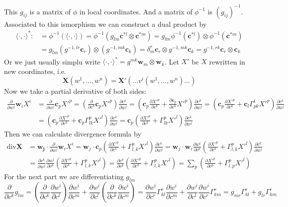 This $g_{ij}$ is a matrix of $\phi$ in local coordinates. And a matrix of $\phi^{-1}$ is
$(g_{ij})^{-1}$. Associated to this ismorphism we can construct a dual product by
\begin{align*}
    \langle\cdot,\cdot\rangle^*:&=\phi^{-1}(\langle\cdot,\cdot\rangle)=\phi^{-1}(g_{lm}\mathbf{c}^{*l}\otimes\mathbf{c}^{*m})
=g_{lm}\phi^{-1}(\mathbf{c}^{*l})\otimes\phi^{-1}(\mathbf{c}^{*m})\\
    &=g_{lm}(g^{-1,lr}\mathbf{c}_r)\otimes(g^{-1,mk}\mathbf{c}_k)
=\delta_m^r\mathbf{c}_r\otimes g^{-1,mk}\mathbf{c}_k=g^{-1,rk}\mathbf{c}_r\otimes \mathbf{c}_k
\end{align*}
Or we just usually simplu write $\langle\cdot,\cdot\rangle^*=g^{mk}\mathbf{w}_m\otimes \mathbf{w}_k$.
Let $X'$ be $X$ rewritten in new coordinates, i.e.
\[\mathbf{X}(w^1,...,w^n)=\mathbf{X}'(...v^i(w^1,...,w^n)...)\]
Now we take a partial derivative of both sides:
\begin{align*}
\frac{\partial}{\partial w^j}\mathbf{w}_iX^i&
=\frac{\partial}{\partial w^j}\mathbf{c}_pX'^p
=(\frac{\partial}{\partial c^k}\mathbf{c}_pX'^p)\frac{\partial c^k}{\partial w^j}
=(\mathbf{c}_p\frac{\partial X'^p}{\partial c^k}+\frac{\partial\mathbf{c}_p}{\partial c^k}X'^p)\frac{\partial c^k}{\partial w^j}
=(\mathbf{c}_p\frac{\partial X'^p}{\partial c^k}+\mathbf{c}_l\Gamma^l_{pk}X'^p)\frac{\partial c^k}{\partial w^j}\\
&=(\mathbf{c}_p\frac{\partial X'^p}{\partial c^k}+\mathbf{c}_p\Gamma^p_{lk}X'^l)\frac{\partial c^k}{\partial w^j}
=\mathbf{c}_p(\frac{\partial X'^p}{\partial c^k}+\Gamma^p_{lk}X'^l)\frac{\partial c^k}{\partial w^j}
\end{align*}
Then we can calculate divergence formula by
\begin{align*}
\text{div}\mathbf{X}&=\mathbf{w_j}\cdot\frac{\partial}{\partial w^j}\mathbf{w}_iX^i
=\mathbf{w}_j\cdot\mathbf{c}_p(\frac{\partial X'^p}{\partial c^k}+\Gamma^p_{l,k}X'^l)\frac{\partial c^k}{\partial w^j}
=\mathbf{w}_j\cdot\mathbf{w}_i\frac{\partial w^i}{\partial c^p}(\frac{\partial X'^p}{\partial c^k}+\Gamma^p_{l,k}X'^l)\frac{\partial c^k}{\partial w^j}\\
&=\frac{\partial c^k}{\partial w^j}\frac{\partial w^j}{\partial c^p}(\frac{\partial X'^p}{\partial c^k}+\Gamma^p_{l,k}X'^l)
=\frac{\partial c^k}{\partial c^p}(\frac{\partial X'^p}{\partial c^k}+\Gamma^p_{l,k}X'^l)
=\sum_p(\frac{\partial X'^p}{\partial c^p}+\Gamma^p_{l,p}X'^l)
\end{align*}
For the next part we are differentiating $g_{lm}$
\[\frac{\partial}{\partial c^k}g_{lm}=(\frac{\partial}{\partial c^k}\frac{\partial w^i}{\partial c^l})\frac{\partial w^i}{\partial c^m}
+\frac{\partial w^i}{\partial c^l}(\frac{\partial}{\partial c^k}\frac{\partial w^i}{\partial c^m})
=\frac{\partial w^i}{\partial c^r}\Gamma^r_{kl}\frac{\partial w^i}{\partial c^m}+
\frac{\partial w^i}{\partial c^l}\frac{\partial w^i}{\partial c^r}\Gamma^r_{km}
=g_{mr}\Gamma^r_{kl}+g_{lr}\Gamma^r_{km}\]
